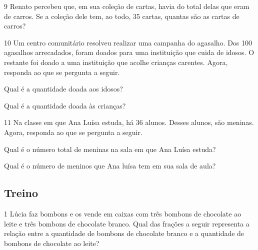 \begin{mdframed}[linewidth=2pt,linecolor=salmao,roundcorner=2pt]
\begin{escolha}
{\begin{escolha}
\num{9} Renato percebeu que, em sua coleção de cartas, havia  do total delas
que eram de carros. Se a coleção dele tem, ao todo, 35 cartas, quantas são
as cartas de carros?

\begin{mdframed}[linewidth=2pt,linecolor=salmao,roundcorner=2pt]
\vspace{2cm}
\end{mdframed}

\num{10} Um centro comunitário resolveu realizar uma campanha do agasalho. Dos
100 agasalhos arrecadados,  foram doados para uma instituição que
cuida de idosos. O restante foi doado a uma instituição que acolhe
crianças carentes. Agora, responda ao que se pergunta a seguir.

\begin{escolha}
\item
  Qual é a quantidade doada aos idosos?


\item
  Qual é a quantidade doada às crianças?

\end{escolha}


\num{11} Na classe em que Ana Luísa estuda, há 36 alunos. Desses alunos, 
são meninas. Agora, responda ao que se pergunta a seguir.

\begin{escolha}
\item
  Qual é o número total de meninas na sala em que Ana Luísa estuda?


\item
  Qual é o número de meninos que Ana luísa tem em sua sala de aula?

\end{escolha}

\subsection{Treino}

\num{1} Lúcia faz bombons e os vende em caixas com três bombons de chocolate ao leite e três bombons de chocolate branco. Qual das frações a seguir representa a relação entre a quantidade de
bombons de chocolate branco e a quantidade de bombons de chocolate ao leite?


\end{escolha}}
\end{escolha}
\end{mdframed}
